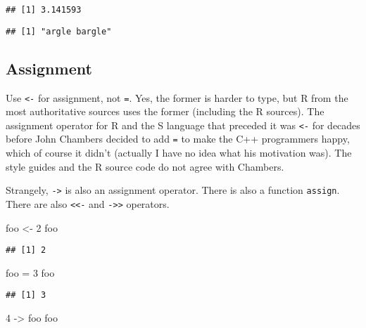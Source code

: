 \documentclass[
]{article}
\newenvironment{Shaded}{\begin{snugshade}}{\end{snugshade}}
\newcommand{\DecValTok}[1]{\textcolor[rgb]{0.00,0.00,0.81}{#1}}
\newcommand{\NormalTok}[1]{#1}
\newcommand{\OtherTok}[1]{\textcolor[rgb]{0.56,0.35,0.01}{#1}}
\begin{document}
\begin{verbatim}
## [1] 3.141593
\end{verbatim}

\begin{verbatim}
## [1] "argle bargle"
\end{verbatim}

\hypertarget{assignment}{%
\subsection{Assignment}\label{assignment}}

Use \texttt{\textless{}-} for assignment, not \texttt{=}. Yes, the
former is harder to type, but R from the most authoritative sources uses
the former (including the R sources). The assignment operator for R and
the S language that preceded it was \texttt{\textless{}-} for decades
before John Chambers decided to add \texttt{=} to make the C++
programmers happy, which of course it didn't (actually I have no idea
what his motivation was). The style guides and the R source code do not
agree with Chambers.

Strangely, \texttt{-\textgreater{}} is also an assignment operator.
There is also a function \texttt{assign}. There are also
\texttt{\textless{}\textless{}-} and
\texttt{-\textgreater{}\textgreater{}} operators.

\begin{Shaded}
\begin{Highlighting}[]
\NormalTok{foo }\OtherTok{\textless{}{-}} \DecValTok{2}
\NormalTok{foo}
\end{Highlighting}
\end{Shaded}

\begin{verbatim}
## [1] 2
\end{verbatim}

\begin{Shaded}
\begin{Highlighting}[]
\NormalTok{foo }\OtherTok{=} \DecValTok{3}
\NormalTok{foo}
\end{Highlighting}
\end{Shaded}

\begin{verbatim}
## [1] 3
\end{verbatim}

\begin{Shaded}
\begin{Highlighting}[]
\DecValTok{4} \OtherTok{{-}\textgreater{}}\NormalTok{ foo}
\NormalTok{foo}
\end{Highlighting}
\end{Shaded}
\end{document}
